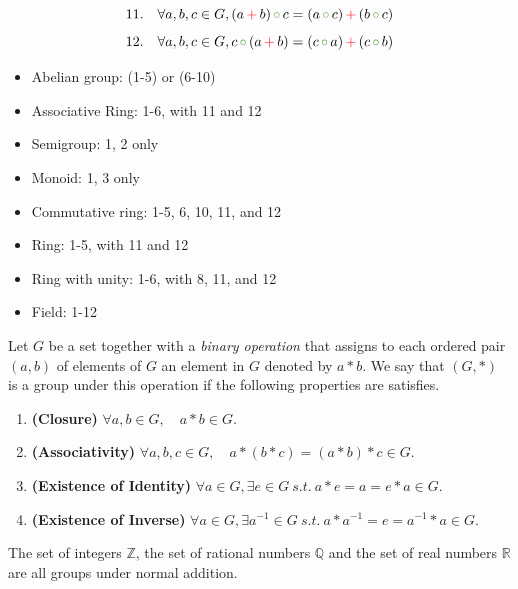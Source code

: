 \[11. \quad \forall a, b, c \in G, (a \, {\color{red} +}\, b) \, {\color{extinctGreen} \circ}\, c = (a \, {\color{extinctGreen} \circ}\, c) \, {\color{red} +}\, (b \, {\color{extinctGreen} \circ}\, c)  \]
\[12. \quad \forall a, b, c \in G, c \, {\color{extinctGreen} \circ}\, (a \, {\color{red} +}\, b) = (c \, {\color{extinctGreen} \circ}\, a) \, {\color{red} +}\, (c \, {\color{extinctGreen} \circ}\, b)  \]

\begin{itemize}
    \item Abelian group: (1-5) or (6-10)
    \item Associative Ring: 1-6, with 11 and 12
    \item Semigroup: 1, 2 only
    \item Monoid: 1, 3 only
    \item Commutative ring: 1-5, 6, 10, 11, and 12
    \item Ring: 1-5, with 11 and 12
    \item Ring with unity: 1-6, with 8, 11, and 12
    \item Field: 1-12
\end{itemize}

\begin{axiom}[Groups]
    Let $G$ be a set together with a \textit{binary operation} that assigns to each ordered pair $(a,b)$ of elements of $G$ an element in 
    $G$ denoted by $a * b$. We say that $(G, *)$ is a group under this operation if the following 
    properties are satisfies.
    \begin{enumerate}
        \item \textbf{(Closure)} $\forall a, b \in G, \quad a * b \in G$.
        \item \textbf{(Associativity)} $\forall a, b, c \in G, \quad a * (b * c) = (a * b) * c \in G$.
        \item \textbf{(Existence of Identity)} $\forall a \in G, \exists e \in G \> s.t. \> a * e = a = e * a \in G$.
        \item \textbf{(Existence of Inverse)} $\forall a \in G, \exists a^{-1} \in G \> s.t. \> a * a^{-1} = e = a^{-1} * a \in G$.
    \end{enumerate}
\end{axiom}

\begin{example}
    The set of integers $\mathbb{Z}$, the set of rational numbers $\mathbb{Q}$ and the set of real numbers $\mathbb{R}$ are all groups under 
    normal addition.
\end{example}

